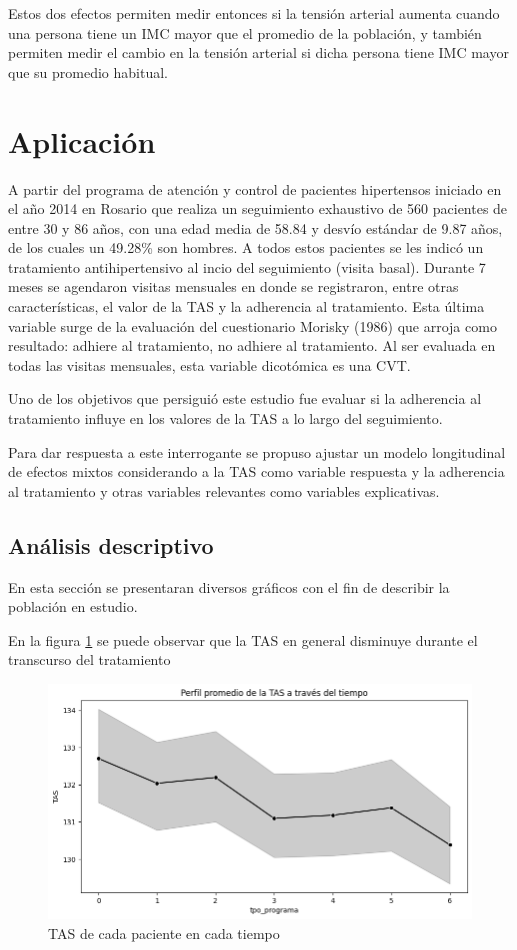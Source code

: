 \documentclass[spanish]{article}
\numberwithin{figure}{subsection}
\numberwithin{equation}{subsection}
\numberwithin{table}{subsection}
\def\npatients{560}
\begin{document}
Estos dos efectos permiten medir entonces si la tensión arterial aumenta cuando
una persona tiene un IMC mayor que el promedio de la población, y también
permiten medir el cambio en la tensión arterial si dicha persona tiene IMC mayor
que su promedio habitual.

\newpage

\section{Aplicación}

A partir del programa de atención y control de pacientes hipertensos iniciado en
el año 2014 en Rosario que realiza un seguimiento exhaustivo de \npatients{}
pacientes de entre 30 y 86 años, con una edad media de 58.84 y desvío estándar
de 9.87 años, de los cuales un 49.28\% son hombres. A todos estos pacientes se
les indicó un tratamiento antihipertensivo al incio del seguimiento (visita
basal). Durante 7 meses se agendaron visitas mensuales en donde se registraron,
entre otras características, el valor de la TAS y la adherencia al tratamiento.
Esta última variable surge de la evaluación del cuestionario Morisky (1986) que
arroja como resultado: adhiere al tratamiento, no adhiere al tratamiento. Al ser
evaluada en todas las visitas mensuales, esta variable dicotómica es una CVT.

Uno de los objetivos que persiguió este estudio fue evaluar si la adherencia al
tratamiento influye en los valores de la TAS a lo largo del seguimiento.

Para dar respuesta a este interrogante se propuso ajustar un modelo longitudinal
de efectos mixtos considerando a la TAS como variable respuesta y la adherencia
al tratamiento y otras variables relevantes como variables explicativas.

\subsection{Análisis descriptivo}

En esta sección se presentaran diversos gráficos con el fin de describir la
población en estudio.

En la figura \ref{TAS_vs_tpo} se puede observar que la TAS en general disminuye
durante el transcurso del tratamiento

\begin{figure}[H]
	\centering
	\includegraphics[scale=0.5]{img/TAS_vs_tpo.png}
	\caption{TAS de cada paciente en cada tiempo}
	\label{TAS_vs_tpo}
\end{figure}
\end{document}
